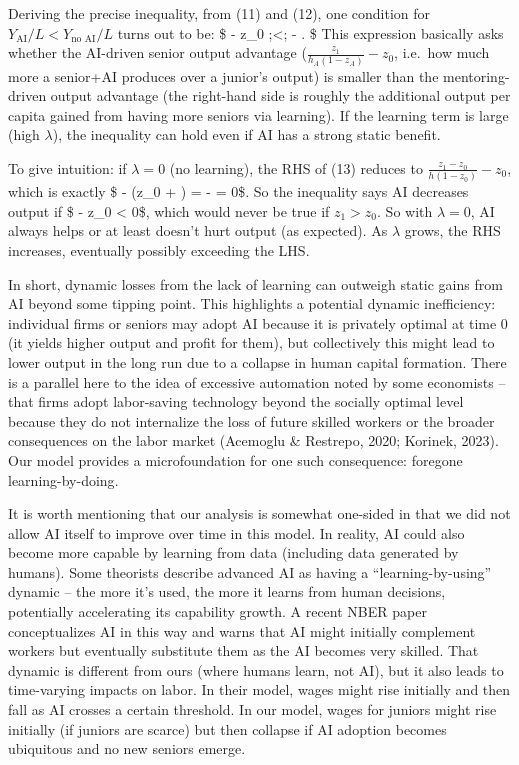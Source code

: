 \documentclass[12pt]{article}
\begin{document}
Deriving the precise inequality, from (11) and (12), one condition for
\(Y_{\text{AI}}/L < Y_{\text{no AI}}/L\) turns out to be: \$
 - z\_0 ;\textless;
 -
. \$ This
expression basically asks whether the {AI-driven senior output
advantage} (\(\frac{z_1}{h_A(1-z_A)} - z_0\), i.e.~how much more a
senior+AI produces over a junior's output) is smaller than the
{mentoring-driven output advantage} (the right-hand side is
roughly the additional output per capita gained from having more seniors
via learning). If the learning term is large (high \(\lambda\)), the
inequality can hold even if AI has a strong static benefit.

To give intuition: if \(\lambda = 0\) (no learning), the RHS of (13)
reduces to \(\frac{z_1 - z_0}{h(1-z_0)} - z_0\), which is exactly \$
 - (z\_0 + ) =
 -  = 0\$. So the inequality
says AI decreases output if \$  - z\_0 \textless{}
0\$, which would {never} be true if \(z_1 > z_0\). So with
\(\lambda=0\), AI always helps or at least doesn't hurt output (as
expected). As \(\lambda\) grows, the RHS increases, eventually possibly
exceeding the LHS.

In short, {dynamic losses from the lack of learning can outweigh
static gains from AI} beyond some tipping point. This highlights a
potential {dynamic inefficiency}: individual firms or seniors may
adopt AI because it is privately optimal at time 0 (it yields higher
output and profit for them), but collectively this might lead to lower
output in the long run due to a collapse in human capital formation.
There is a parallel here to the idea of {excessive automation}
noted by some economists -- that firms adopt labor-saving technology
beyond the socially optimal level because they do not internalize the
loss of future skilled workers or the broader consequences on the labor
market (Acemoglu \& Restrepo, 2020; Korinek, 2023). Our model provides a
microfoundation for one such consequence: {foregone
learning-by-doing}.

It is worth mentioning that our analysis is somewhat one-sided in that
{we did not allow AI itself to improve} over time in this model.
In reality, AI could also become more capable by learning from data
(including data generated by humans). Some theorists describe advanced
AI as having a ``learning-by-using'' dynamic -- the more it's used, the
more it learns from human decisions, potentially {accelerating} its
capability growth. A recent NBER paper conceptualizes AI in this way and
warns that AI might initially complement workers but eventually
substitute them as the AI becomes very skilled. That dynamic is
different from ours (where humans learn, not AI), but it also leads to
time-varying impacts on labor. In their model, wages might rise
initially and then fall as AI crosses a certain threshold. In our model,
wages for juniors might rise initially (if juniors are scarce) but then
collapse if AI adoption becomes ubiquitous and no new seniors emerge.
\end{document}
